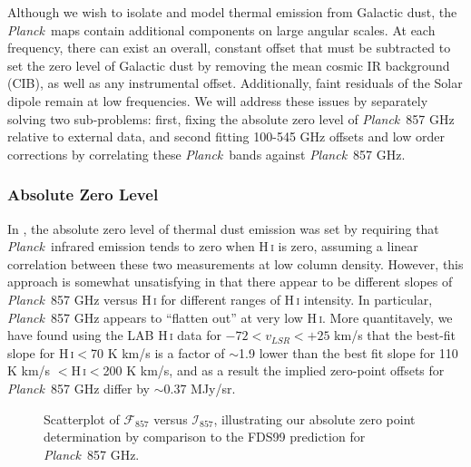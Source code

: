 \documentclass{emulateapj}
\newcommand{\PLANCK}{{\it Planck}}
\begin{document}


Although we wish to isolate and model thermal emission from Galactic dust, the
\PLANCK~maps contain additional components on large angular scales. At each 
frequency, there can exist an overall, constant offset that must be subtracted 
to set the zero level of Galactic dust by removing the mean cosmic IR 
background (CIB), as well as any instrumental offset. Additionally, faint 
residuals of the Solar dipole remain at low frequencies. We will address these 
issues by separately solving two sub-problems: first, fixing the absolute zero 
level of \PLANCK~857 GHz relative to external data, and second fitting 
100-545 GHz offsets and low order corrections by correlating these 
\PLANCK~bands against \PLANCK~857 GHz.

\subsubsection{Absolute Zero Level}
\label{sec:zp_abs}
In \cite{planckdust}, the absolute zero level of thermal dust emission was set 
by requiring that \PLANCK~infrared emission tends to zero when H\,\textsc{i} is
zero, assuming a linear correlation between these two measurements at low 
column density. However, this approach is somewhat unsatisfying in that there 
appear to be different slopes of \PLANCK~857 GHz versus H\,\textsc{i} for 
different ranges of H\,\textsc{i} intensity. In particular, \PLANCK~857 GHz 
appears to ``flatten out'' at very low H\,\textsc{i}. More quantitavely, we 
have found using the LAB H\,\textsc{i} data \citep{lab} for 
$-72$$<$$v_{LSR}$$<$$+25$ km/s that the best-fit slope for H\,\textsc{i}$<$70 K
km/s is a factor of $\sim$1.9 lower than the best fit slope for 110 K km/s 
$<$H\,\textsc{i}$<$200 K km/s, and as a result the implied zero-point offsets 
for \PLANCK~857 GHz differ by $\sim$0.37 MJy/sr.


\begin{figure}
\begin{center}
\caption{\label{fig:fdsref} Scatterplot of $\mathcal{F}_{857}$ versus 
$\mathcal{I}_{857}$, illustrating our absolute zero point determination by
comparison to the FDS99 prediction for \PLANCK~857 GHz.}
\end{center}
\end{figure}
\end{document}
